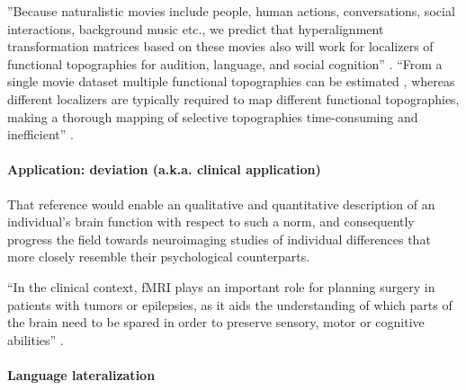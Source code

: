 %
''Because naturalistic movies include people, human actions, conversations,
social interactions, background music etc., we predict that hyperalignment
transformation matrices based on these movies also will work for localizers of
functional topographies for audition, language, and social cognition''
\citep{jiahui2020predicting}.
%
``From a single movie dataset multiple functional topographies can be estimated
\citep{guntupalli2016model}, whereas different localizers are typically required
to map different functional topographies, making a thorough mapping of selective
topographies time-consuming and inefficient'' \citep{jiahui2020predicting}.


\paragraph{Application: deviation (a.k.a. clinical application)}





%
That reference would enable an qualitative and quantitative description of an
individual's brain function with respect to such a norm, and consequently
progress the field towards neuroimaging studies of individual differences that
more closely resemble their psychological counterparts.


``In the clinical context, fMRI plays an important role for planning surgery in
patients with tumors or epilepsies, as it aids the understanding of which parts
of the brain need to be spared in order to preserve sensory, motor or cognitive
abilities'' \citep{wegrzyn2018thought}.


\paragraph{Language lateralization}


